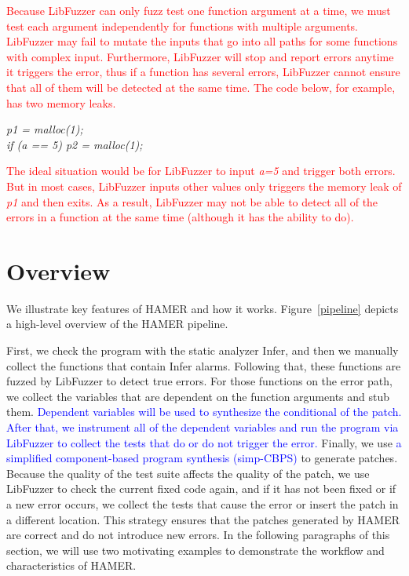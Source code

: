 \documentclass[a4paper,11pt,oneside,openany]{book}
\begin{document}
\textcolor{red}{
Because LibFuzzer can only fuzz test one function argument at a time, we must test each argument independently for functions with multiple arguments. LibFuzzer may fail to mutate the inputs that go into all paths for some functions with complex input. Furthermore, LibFuzzer will stop and report errors anytime it triggers the error, thus if a function has several errors, LibFuzzer cannot ensure that all of them will be detected at the same time. The code below, for example, has two memory leaks. 
}

\begin{minipage}{\textwidth}
    \vspace{0.2cm}
    \textsl{\hspace{0.3cm}p1 = malloc(1);\\\hspace{0.3cm}if (a == 5) p2 = malloc(1);\\}
\end{minipage}
\textcolor{red}{
The ideal situation would be for LibFuzzer to input {\it a=5} and trigger both errors. But in most cases,  LibFuzzer inputs other values only triggers the memory leak of {\it p1} and then exits. As a result, LibFuzzer may not be able to detect all of the errors in a function at the same time (although it has the ability to do).
}


\chapter{Overview}

We illustrate key features of HAMER and how it works. Figure~\ref{pipeline} depicts a high-level overview of the HAMER pipeline.

First, we check the program with the static analyzer \mbox{Infer}, and then we manually collect the functions that contain Infer alarms. Following that, these functions are fuzzed by LibFuzzer to detect true errors.  For those functions on the error path, we collect the variables that are dependent on the function arguments and stub them. \textcolor{blue}{Dependent variables will be used to synthesize the conditional of the patch. After that, we instrument all of the dependent variables and run the program via LibFuzzer to collect the tests that do or do not trigger the error.} Finally, we use \textcolor{blue}{a simplified component-based program synthesis (simp-CBPS)} to generate patches. Because the quality of the test suite affects the quality of the patch, we use LibFuzzer to check the current fixed code again, and if it has not been fixed or if a new error occurs, we collect the tests that cause the error or insert the patch in a different location. This strategy ensures that the patches generated by HAMER are correct and do not introduce new errors. In the following paragraphs of this section, we will use two motivating examples to demonstrate the workflow and characteristics of HAMER.
\end{document}
